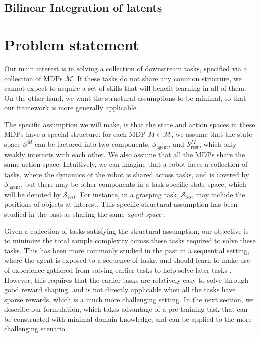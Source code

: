 \documentclass{article} %
\newcommand{\sset}{\mathcal{S}}
\newcommand{\mdpset}{\mathcal{M}}
\newcommand{\agent}{\mathrm{agent}}
\begin{document}
\subsection{Bilinear Integration of latents}

\section{Problem statement}

Our main interest is in solving a collection of downstream tasks, specified via a collection of MDPs $\mdpset$. If these tasks do not share any common structure, we cannot expect to acquire a set of skills that will benefit learning in all of them. On the other hand, we want the structural assumptions to be minimal, so that our framework is more generally applicable.

The specific assumption we will make, is that the state and action spaces in these MDPs have a special structure: for each MDP $M \in \mdpset$, we assume that the state space $\sset^M$ can be factored into two components, $\sset_\agent$, and $\sset_{\mathrm{rest}}^M$, which only weakly interacts with each other.
We also assume that all the MDPs share the same action space.
Intuitively, we can imagine that a robot faces a collection of tasks, where the dynamics of the robot is shared across tasks, and is covered by $\sset_\agent$, but there may be other components in a task-specific state space, which will be denoted by $\sset_{\mathrm{rest}}$. For instance, in a grasping task, $\sset_{\mathrm{rest}}$ may include the positions of objects at interest. This specific structural assumption has been studied in the past as sharing the same \emph{agent-space} \citep{konidaris2007building}.

Given a collection of tasks satisfying the structural assumption, our objective is to minimize the total sample complexity across these tasks required to solve these tasks. This has been more commonly studied in the past in a sequential setting, where the agent is exposed to a sequence of tasks, and should learn to make use of experience gathered from solving earlier tasks to help solve later tasks \citep{taylor2009transfer, wilson2007multi, lazaric2010bayesian, devin2016learning}. However, this requires that the earlier tasks 
are relatively easy to solve through good reward shaping, and is not directly applicable when all the tasks have sparse rewards, which is a much more challenging setting. In the next section, we describe our formulation, which takes advantage of a pre-training task that can be constructed with minimal domain knowledge, and can be applied to the more challenging scenario.%
\end{document}
